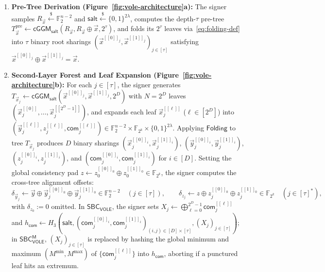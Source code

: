 \documentclass[11pt,a4paper]{article}
\theoremstyle{definition}
\theoremstyle{remark}
\newcommand{\Ftwo}{\mathbb{F}_2}
\newcommand{\Ftwok}{\mathbb{F}_{2^k}}
\newcommand{\SBCVOLE}{\mathsf{SBC}_{\mathsf{VOLE}}}
\newcommand{\SBCVOLEM}{\mathsf{SBC}_{\mathsf{VOLE}}^{\mathsf{M}}}
\newcommand{\salt}{\mathsf{salt}}
\newcommand{\com}{\mathsf{com}}
\newcommand{\cGGM}{\mathsf{cGGM}}
\newcommand{\Folding}{\mathsf{Folding}}
\newcommand{\share}[1]{[\![#1]\!]}
\begin{document}
\begin{enumerate}[leftmargin=2em]
    \item \textbf{Pre-Tree Derivation (Figure~\ref{fig:vole-architecture}a):}
    The signer samples $R_{\vec{x}} \xleftarrow{\$} \Ftwo^{n-2}$ and $\salt \xleftarrow{\$} \{0,1\}^{2\lambda}$, computes the depth-$\tau$ pre-tree $T_{\vec{x}}^{\text{pre}} \leftarrow \cGGM_{\salt}(R_{\vec{x}}, R_{\vec{x}} \oplus \vec{x}, 2^\tau)$, and folds its $2^\tau$ leaves via~\eqref{eq:folding-def} into $\tau$ binary root sharings $(\vec{x}^{\share{0}_j}, \vec{x}^{\share{1}_j})_{j \in [\tau]}$ satisfying $\vec{x}^{\share{0}_j} \oplus \vec{x}^{\share{1}_j} = \vec{x}$.

    \item \textbf{Second-Layer Forest and Leaf Expansion (Figure~\ref{fig:vole-architecture}b):}
    For each $j \in [\tau]$, the signer generates $T_{\vec{x}_j} \leftarrow \cGGM_{\salt}(\vec{x}^{\share{0}_j}, \vec{x}^{\share{1}_j}, 2^D)$ with $N = 2^D$ leaves $(\vec{x}_j^{\share{0}}, \dots, \vec{x}_j^{\share{2^D-1}})$, and expands each leaf $\vec{x}_j^{\share{\ell}}$ ($\ell \in [2^D]$) into $(\vec{y}_j^{\share{\ell}}, z_j^{\share{\ell}}, \com_j^{\share{\ell}}) \in \Ftwo^{n-2} \times \Ftwok \times \{0,1\}^{2\lambda}$. Applying $\Folding$ to tree $T_{\vec{x}_j}$ produces $D$ binary sharings $(\vec{x}_j^{\share{0}_i}, \vec{x}_j^{\share{1}_i})$, $(\vec{y}_j^{\share{0}_i}, \vec{y}_j^{\share{1}_i})$, $(z_j^{\share{0}_i}, z_j^{\share{1}_i})$, and $(\com_j^{\share{0}_i}, \com_j^{\share{1}_i})$ for $i \in [D]$. Setting the global consistency pad $z \leftarrow z_0^{\share{0}_0} \oplus z_0^{\share{1}_0} \in \Ftwok$, the signer computes the cross-tree alignment offsets:
    \begin{equation}
    \label{eq:offsets}
    \delta_{\vec{y}_j} \leftarrow \vec{y} \oplus \vec{y}_j^{\share{0}_0} \oplus \vec{y}_j^{\share{1}_0} \in \Ftwo^{n-2} \quad (j \in [\tau]), \qquad
    \delta_{z_j} \leftarrow z \oplus z_j^{\share{0}_0} \oplus z_j^{\share{1}_0} \in \Ftwok \quad (j \in [\tau]^*),
    \end{equation}
    with $\delta_{z_0} := 0$ omitted. In $\SBCVOLE$, the signer sets $X_j \leftarrow \bigoplus_{\ell=0}^{2^D-1} \com_j^{\share{\ell}}$ and $h_{\com} \leftarrow H_3(\salt, (\com_j^{\share{0}_i}, \com_j^{\share{1}_i})_{(i,j) \in [D] \times [\tau]}, (X_j)_{j \in [\tau]})$; in $\SBCVOLEM$, $(X_j)_{j \in [\tau]}$ is replaced by hashing the global minimum and maximum $(M^{\min}, M^{\max})$ of $\{\com_j^{\share{\ell}}\}$ into $h_{\com}$, aborting if a punctured leaf hits an extremum.


\end{enumerate}
\end{document}
